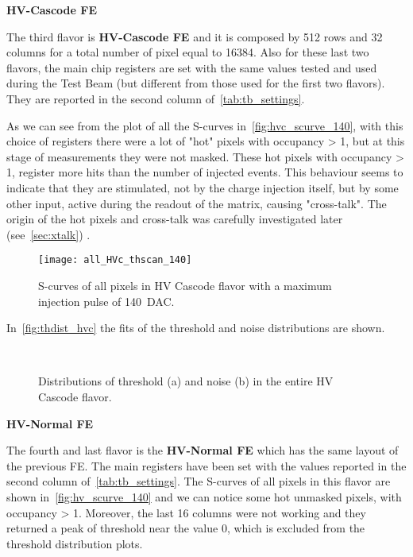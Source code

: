 \medskip
\begin{description}
\item \textbf{HV-Cascode FE}
\end{description}

The third flavor is \textbf{HV-Cascode FE} and it is composed by 512 rows and 32 columns for a total number of pixel equal to 16384. Also for these last two flavors, the main chip registers are set with the same values tested and used during the Test Beam (but different from those used for the first two flavors). They are reported in the second column of~\autoref{tab:tb_settings}.

As we can see from the plot of all the S-curves in~\autoref{fig:hvc_scurve_140}, with this choice of registers there were a lot of "hot" pixels with occupancy > 1, but at this stage of measurements they were not masked.
These hot pixels with occupancy > 1, register more hits than the number of injected events. This behaviour seems to indicate that they are stimulated, not by the charge injection itself, but by some other input, active during the readout of the matrix, causing "cross-talk". The origin of the hot pixels and cross-talk was carefully investigated later (see~\autoref{sec:xtalk})
.

\begin{figure}[h!]
\centering
\texttt{[image: all\_HVc\_thscan\_140]}
\caption{S-curves of all pixels in HV Cascode flavor with a maximum injection pulse of \SI{140}{DAC}.}
\label{fig:hvc_scurve_140}
\end{figure}

In~\autoref{fig:thdist_hvc} the fits of the threshold and noise distributions are shown.

\begin{figure}[h!]
\centering
{}\quad
{}\\
\caption{Distributions of threshold (a) and noise (b) in the entire HV Cascode flavor.}
\label{fig:thdist_hvc}
\end{figure}


\medskip
\begin{description}
\item \textbf{HV-Normal FE}
\label{sec:first_xtalk}
\end{description}


The fourth and last flavor is the \textbf{HV-Normal FE} which has the same layout of the previous FE. The main registers have been set with the values reported in the second column of~\autoref{tab:tb_settings}.
The S-curves of all pixels in this flavor are shown in~\autoref{fig:hv_scurve_140} and we can notice some hot unmasked pixels, with occupancy > 1.
Moreover, the last 16 columns were not working and they returned a peak of threshold near the value 0, which is excluded from the threshold distribution plots.

